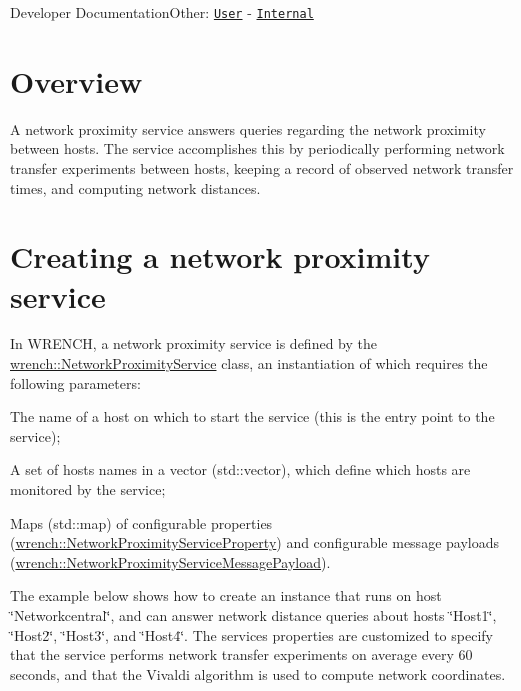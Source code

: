Developer DocumentationOther\+: \href{../user/guide-networkproximity.html}{\tt User} -\/ \href{../internal/guide-networkproximity.html}{\tt Internal}\hypertarget{guide-networkproximity_guide-networkproximity-overview}{}\section{Overview}\label{guide-networkproximity_guide-networkproximity-overview}
A network proximity service answers queries regarding the network proximity between hosts. The service accomplishes this by periodically performing network transfer experiments between hosts, keeping a record of observed network transfer times, and computing network distances.\hypertarget{guide-networkproximity_guide-networkproximity-creating}{}\section{Creating a network proximity service}\label{guide-networkproximity_guide-networkproximity-creating}
In W\+R\+E\+N\+CH, a network proximity service is defined by the {\ttfamily \hyperlink{classwrench_1_1_network_proximity_service}{wrench\+::\+Network\+Proximity\+Service}} class, an instantiation of which requires the following parameters\+:


\begin{DoxyItemize}
\item The name of a host on which to start the service (this is the entry point to the service);
\item A set of hosts names in a vector ({\ttfamily std\+::vector}), which define which hosts are monitored by the service;
\item Maps ({\ttfamily std\+::map}) of configurable properties ({\ttfamily \hyperlink{classwrench_1_1_network_proximity_service_property}{wrench\+::\+Network\+Proximity\+Service\+Property}}) and configurable message payloads ({\ttfamily \hyperlink{classwrench_1_1_network_proximity_service_message_payload}{wrench\+::\+Network\+Proximity\+Service\+Message\+Payload}}).
\end{DoxyItemize}

The example below shows how to create an instance that runs on host \char`\"{}\+Networkcentral\char`\"{}, and can answer network distance queries about hosts \char`\"{}\+Host1\char`\"{}, \char`\"{}\+Host2\char`\"{}, \char`\"{}\+Host3\char`\"{}, and \char`\"{}\+Host4\char`\"{}. The service\textquotesingle{}s properties are customized to specify that the service performs network transfer experiments on average every 60 seconds, and that the Vivaldi algorithm is used to compute network coordinates.


